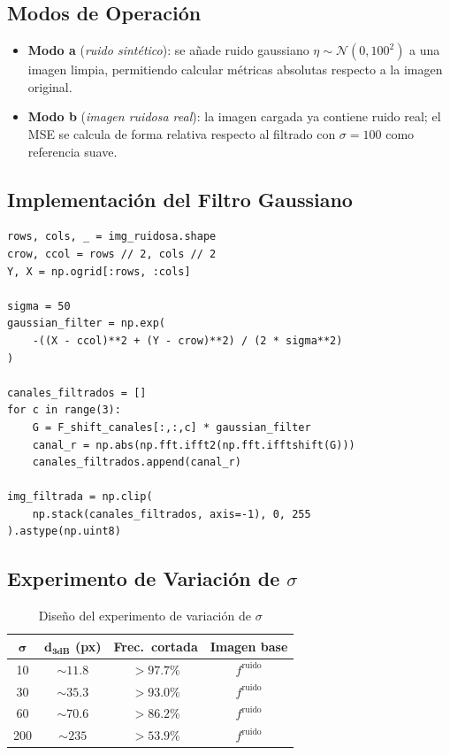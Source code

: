 \documentclass[conference]{IEEEtran}
\begin{document}
\subsection{Modos de Operación}

\begin{itemize}
  \item \textbf{Modo a} (\textit{ruido sintético}): se añade ruido gaussiano
    $\eta \sim \mathcal{N}(0, 100^2)$ a una imagen limpia, permitiendo
    calcular métricas absolutas respecto a la imagen original.
  \item \textbf{Modo b} (\textit{imagen ruidosa real}): la imagen cargada
    ya contiene ruido real; el MSE se calcula de forma relativa respecto
    al filtrado con $\sigma=100$ como referencia suave.
\end{itemize}

\subsection{Implementación del Filtro Gaussiano}

\begin{lstlisting}[caption={Construcción y aplicación del filtro gaussiano},
                   label={lst:filtro}]
rows, cols, _ = img_ruidosa.shape
crow, ccol = rows // 2, cols // 2
Y, X = np.ogrid[:rows, :cols]

sigma = 50
gaussian_filter = np.exp(
    -((X - ccol)**2 + (Y - crow)**2) / (2 * sigma**2)
)

canales_filtrados = []
for c in range(3):
    G = F_shift_canales[:,:,c] * gaussian_filter
    canal_r = np.abs(np.fft.ifft2(np.fft.ifftshift(G)))
    canales_filtrados.append(canal_r)

img_filtrada = np.clip(
    np.stack(canales_filtrados, axis=-1), 0, 255
).astype(np.uint8)
\end{lstlisting}

\subsection{Experimento de Variación de $\sigma$}

\begin{table}[H]
  \centering
  \caption{Diseño del experimento de variación de $\sigma$}
  \label{tab:exp_diseno}
  \begin{tabular}{cccc}
    \toprule
    $\boldsymbol{\sigma}$ & $\boldsymbol{d_{3\text{dB}}}$ \textbf{(px)} &
    \textbf{Frec.\ cortada} & \textbf{Imagen base} \\
    \midrule
    10  & $\sim 11.8$ & $>97.7\%$ & $f^{\text{ruido}}$ \\
    30  & $\sim 35.3$ & $>93.0\%$ & $f^{\text{ruido}}$ \\
    60  & $\sim 70.6$ & $>86.2\%$ & $f^{\text{ruido}}$ \\
    200 & $\sim 235$  & $>53.9\%$ & $f^{\text{ruido}}$ \\
    \bottomrule
  \end{tabular}
\end{table}
\end{document}

